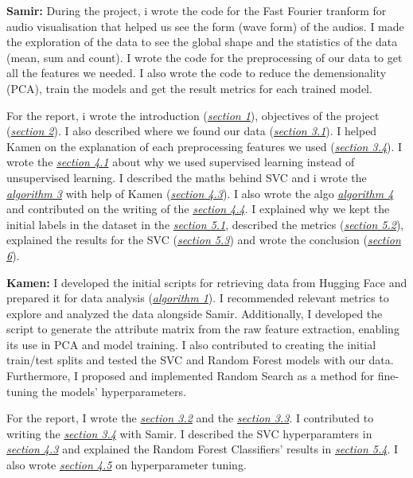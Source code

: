 \documentclass[twocolumn]{article}
\begin{document}
\textbf{Samir:} During the project, i wrote the code for the Fast Fourier tranform for audio visualisation that helped us see the form (wave form) of the audios. I made the exploration of the data to see the global shape and the statistics of the data (mean, sum and count). I wrote the code for the preprocessing of our data to get all the features we needed. I also wrote the code to reduce the demensionality (PCA), train the models and get the result metrics for each trained model.

For the report, i wrote the introduction (\hyperref[1]{\textit{section 1}}), objectives of the project (\hyperref[2]{\textit{section 2}}). I also described where we found our data (\hyperref[3.1]{\textit{section 3.1}}). I helped Kamen on the explanation of each preprocessing features we used (\hyperref[3.4]{\textit{section 3.4}}). I wrote the \hyperref[4.1]{\textit{section 4.1}} about why we used supervised learning instead of unsupervised learning. I described the maths behind SVC and i wrote the \hyperref[algo3]{\textit{algorithm 3}} with help of Kamen (\hyperref[4.3]{\textit{section 4.3}}). I also wrote the algo \hyperref[algo4]{\textit{algorithm 4}} and contributed on the writing of the \hyperref[4.4]{\textit{section 4.4}}. I explained why we kept the initial labels in the dataset in the \hyperref[5.1]{\textit{section 5.1}}, described the metrics (\hyperref[5.2]{\textit{section 5.2}}), explained the results for the SVC (\hyperref[5.3]{\textit{section 5.3}}) and wrote the conclusion (\hyperref[6]{\textit{section 6}}).

\textbf{Kamen:}
I developed the initial scripts for retrieving data from Hugging Face and prepared it for data analysis (\hyperref[algo1]{\textit{algorithm 1}}). I recommended relevant metrics to explore and analyzed the data alongside Samir. Additionally, I developed the script to generate the attribute matrix from the raw feature extraction, enabling its use in PCA and model training. I also contributed to creating the initial train/test splits and tested the SVC and Random Forest models with our data. Furthermore, I proposed and implemented Random Search as a method for fine-tuning the models' hyperparameters. 

For the report, I wrote the \hyperref[3.2]{\textit{section 3.2}} and the \hyperref[3.3]{\textit{section 3.3}}. I contributed to writing the \hyperref[3.4]{\textit{section 3.4}} with Samir. I described the SVC hyperparamters in \hyperref[4.3]{\textit{section 4.3}} and explained the Random Forest Classifiers' results in \hyperref[5.4]{\textit{section 5.4}}. I also wrote \hyperref[4.5]{\textit{section 4.5}} on hyperparameter tuning.
\end{document}
